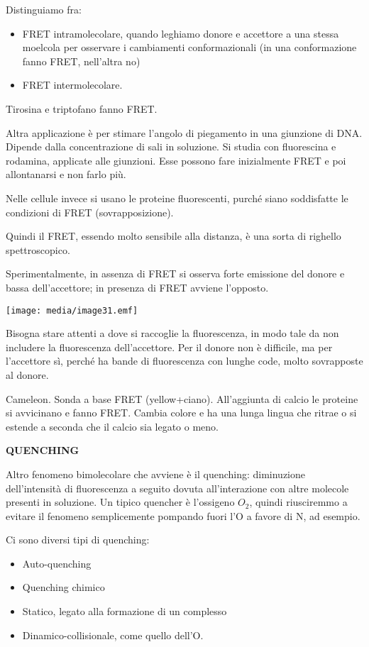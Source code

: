 Distinguiamo fra:

\begin{itemize}
\item
  FRET intramolecolare, quando leghiamo donore e accettore a una stessa
  moelcola per osservare i cambiamenti conformazionali (in una
  conformazione fanno FRET, nell'altra no)
\item
  FRET intermolecolare.
\end{itemize}

Tirosina e triptofano fanno FRET.

Altra applicazione è per stimare l'angolo di piegamento in una giunzione
di DNA. Dipende dalla concentrazione di sali in soluzione. Si studia con
fluorescina e rodamina, applicate alle giunzioni. Esse possono fare
inizialmente FRET e poi allontanarsi e non farlo più.

Nelle cellule invece si usano le proteine fluorescenti, purché siano
soddisfatte le condizioni di FRET (sovrapposizione).

Quindi il FRET, essendo molto sensibile alla distanza, è una sorta di
righello spettroscopico.

Sperimentalmente, in assenza di FRET si osserva forte emissione del
donore e bassa dell'accettore; in presenza di FRET avviene l'opposto.

\texttt{[image: media/image31.emf]}

Bisogna stare attenti a dove si raccoglie la fluorescenza, in modo tale
da non includere la fluorescenza dell'accettore. Per il donore non è
difficile, ma per l'accettore sì, perché ha bande di fluorescenza con
lunghe code, molto sovrapposte al donore.

Cameleon. Sonda a base FRET (yellow+ciano). All'aggiunta di calcio le
proteine si avvicinano e fanno FRET. Cambia colore e ha una lunga lingua
che ritrae o si estende a seconda che il calcio sia legato o meno.

\textbf{QUENCHING}

Altro fenomeno bimolecolare che avviene è il quenching: diminuzione
dell'intensità di fluorescenza a seguito dovuta all'interazione con
altre molecole presenti in soluzione. Un tipico quencher è l'ossigeno
\(O_{2}\), quindi riusciremmo a evitare il fenomeno semplicemente
pompando fuori l'O a favore di N, ad esempio.

Ci sono diversi tipi di quenching:

\begin{itemize}
\item
  Auto-quenching
\item
  Quenching chimico
\item
  Statico, legato alla formazione di un complesso
\item
  Dinamico-collisionale, come quello dell'O.
\end{itemize}


